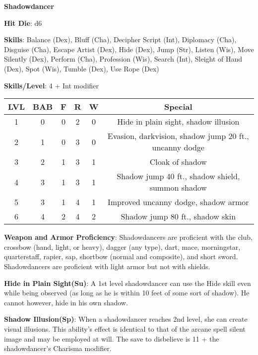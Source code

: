 \textbf{\huge{Shadowdancer}}

\textbf{Hit Die}: d6

\textbf{Skills}: Balance (Dex), Bluff (Cha), Decipher Script (Int), Diplomacy (Cha), Disguise (Cha), Escape Artist (Dex), Hide (Dex), Jump (Str), Listen (Wis), Move Silently (Dex), Perform (Cha), Profession (Wis), Search (Int), Sleight of Hand (Dex), Spot (Wis), Tumble (Dex), Use Rope (Dex)

\textbf{Skills/Level}: 4 + Int modifier

\begin{center}
\begin{adjustwidth}{-4cm}{}
\begin{small}
\begin{tabular}{| c | c | c | c | c | c |}
\hline
LVL &BAB &F &R &W &Special \\
\hline
1 &0 &0 &2 &0 &Hide in plain sight, shadow illusion \\
2 &1 &0 &3 &0 &Evasion, darkvision, shadow jump 20 ft., uncanny dodge \\
3 &2 &1 &3 &1 &Cloak of shadow \\
4 &3 &1 &3 &1 &Shadow jump 40 ft., shadow shield, summon shadow \\
5 &3 &1 &4 &1 &Improved uncanny dodge, shadow armor \\
6 &4 &2 &4 &2 &Shadow jump 80 ft., shadow skin \\
\hline
\end{tabular}
\end{small}
\end{adjustwidth}
\end{center}

\textbf{Weapon and Armor Proficiency}: Shadowdancers are proficient with the club, crossbow (hand, light, or heavy), dagger (any type), dart, mace, morningstar, quarterstaff, rapier, sap, shortbow (normal and composite), and short sword. Shadowdancers are proficient with light armor but not with shields.

\textbf{Hide in Plain Sight(Su)}: A 1st level shadowdancer can use the Hide skill even while being observed (as long as he is within 10 feet of some sort of shadow). He cannot however, hide in his own shadow. 

\textbf{Shadow Illusion(Sp)}: When a shadowdancer reaches 2nd level, she can create visual illusions. This ability’s effect is identical to that of the arcane spell silent image and may be employed at will. The save to disbelieve is 11 + the shadowdancer's Charisma modifier.

